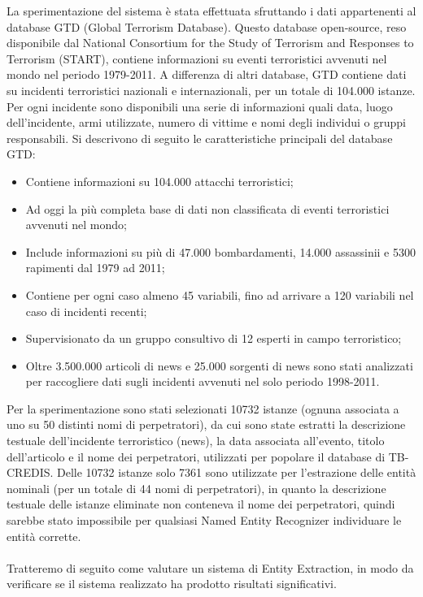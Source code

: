 La sperimentazione del sistema è stata effettuata sfruttando i dati appartenenti al database GTD (Global Terrorism Database)\cite{GTD}.
Questo database open-source, reso disponibile dal National Consortium for the Study of Terrorism and Responses to Terrorism (START), contiene informazioni su eventi terroristici avvenuti nel mondo nel periodo 1979-2011. A differenza di altri database, GTD contiene dati su incidenti terroristici nazionali e internazionali, per un totale di 104.000 istanze. Per ogni incidente sono disponibili una serie di informazioni quali data, luogo dell'incidente, armi utilizzate, numero di vittime e nomi degli individui o gruppi responsabili.
Si descrivono di seguito le caratteristiche principali del database GTD:
\begin{itemize}
	\item Contiene informazioni su 104.000 attacchi terroristici;
	\item Ad oggi la più completa base di dati non classificata di eventi terroristici avvenuti nel mondo;
	\item Include informazioni su più di 47.000 bombardamenti, 14.000 assassinii e 5300 rapimenti dal 1979 ad 2011;
	\item Contiene per ogni caso almeno 45 variabili, fino ad arrivare a 120 variabili nel caso di incidenti recenti;
	\item Supervisionato da un gruppo consultivo di 12 esperti in campo terroristico;
	\item Oltre 3.500.000 articoli di news e 25.000 sorgenti di news sono stati analizzati per raccogliere dati sugli incidenti avvenuti nel solo periodo 1998-2011.
\end{itemize}

Per la sperimentazione sono stati selezionati 10732 istanze (ognuna associata a uno su 50 distinti nomi di perpetratori), da cui sono state estratti la descrizione testuale dell'incidente terroristico (news), la data associata all'evento, titolo dell'articolo e il nome dei perpetratori, utilizzati per popolare il database di TB-CREDIS. 
Delle 10732 istanze solo 7361 sono utilizzate per l'estrazione delle entità nominali (per un totale di 44 nomi di perpetratori), in quanto la descrizione testuale delle istanze eliminate non conteneva il nome dei perpetratori, quindi sarebbe stato impossibile per qualsiasi Named Entity Recognizer individuare le entità corrette.

\paragraph{} Tratteremo di seguito come valutare un sistema di Entity Extraction, in modo da verificare se il sistema realizzato ha prodotto risultati significativi. 


